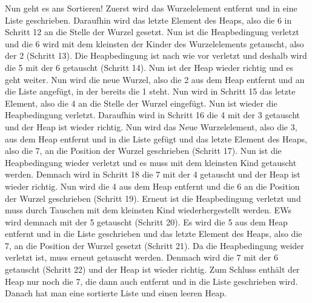 \documentclass{article}
\begin{document}
\pagebreak \large{Nun geht es ans Sortieren! Zuerst wird das Wurzelelement entfernt und in eine Liste geschrieben. Daraufhin wird das letzte Element des Heaps, also die 6 in Schritt 12 an die Stelle der Wurzel gesetzt. Nun ist die Heapbedingung verletzt und die 6 wird mit dem kleinsten der Kinder des Wurzelelements getauscht, also der 2 (Schritt 13). Die Heapbedingung ist nach wie vor verletzt und deshalb wird die 5 mit der 6 getauscht (Schritt 14). Nun ist der Heap wieder richtig und es geht weiter. Nun wird die neue Wurzel, also die 2 aus dem Heap entfernt und an die Liste angefügt, in der bereits die 1 steht. Nun wird in Schritt 15 das letzte Element, also die 4 an die Stelle der Wurzel eingefügt. Nun ist wieder die Heapbedingung verletzt. Daraufhin wird in Schritt 16 die 4 mit der 3 getauscht und der Heap ist wieder richtig. Nun wird das Neue Wurzelelement, also die 3, aus dem Heap entfernt und in die Liste gefügt und das letzte Element des Heaps, also die 7, an die Position der Wurzel geschrieben (Schritt 17). Nun ist die Heapbedingung wieder verletzt und es muss mit dem kleinsten Kind getauscht werden. Demnach wird in Schritt 18 die 7 mit der 4 getauscht und der Heap ist wieder richtig. Nun wird die 4 aus dem Heap entfernt und die 6 an die Position der Wurzel geschrieben (Schritt 19). Erneut ist die Heapbedingung verletzt und muss durch Tauschen mit dem kleinsten Kind wiederhergestellt werden. EWs wird demnach mit der 5 getauscht (Schritt 20). Es wird die 5 aus dem Heap entfernt und in die Liste geschrieben und das letzte Element des Heaps, also die 7, an die Position der Wurzel gesetzt (Schritt 21). Da die Heapbedingung weider verletzt ist, muss erneut getauscht werden. Denmach wird die 7 mit der 6 getauscht (Schritt 22) und der Heap ist wieder richtig. Zum Schluss enthält der Heap nur noch die 7, die dann auch entfernt und in die Liste geschrieben wird. Danach hat man eine sortierte Liste und einen leeren Heap. }
\end{document}
